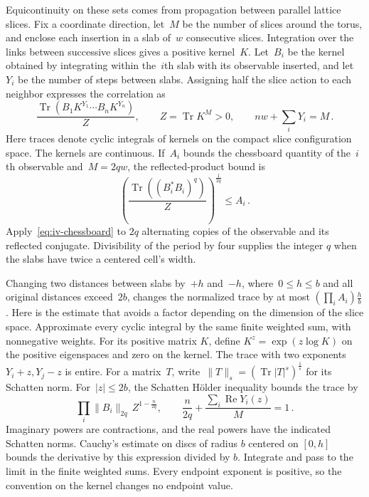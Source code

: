 Equicontinuity on these sets comes from propagation between parallel lattice slices.
Fix a coordinate direction, let~$M$ be the number of slices around the torus, and enclose each insertion in a slab of~$w$ consecutive slices.
Integration over the links between successive slices gives a positive kernel~$K$.
Let~$B_i$ be the kernel obtained by integrating within the~$i$th slab with its observable inserted, and let~$Y_i$ be the number of steps between slabs.
Assigning half the slice action to each neighbor expresses the correlation as
\begin{equation*}
\frac{\operatorname{Tr}(B_1K^{Y_1}\cdots B_nK^{Y_n})}{Z},
\qquad Z=\operatorname{Tr}K^M>0,\qquad nw+\sum_iY_i=M\,.
\end{equation*}
Here traces denote cyclic integrals of kernels on the compact slice configuration space.
The kernels are continuous.
If~$A_i$ bounds the chessboard quantity of the~$i$th observable and~$M=2qw$, the reflected-product bound is
\begin{equation*}
\left(\frac{\operatorname{Tr}((B_i^*B_i)^q)}{Z}\right)^{\frac{1}{2q}}\le A_i\,.
\end{equation*}
Apply~\eqref{eq:iv-chessboard} to $2q$ alternating copies of the observable and its reflected conjugate.
Divisibility of the period by four supplies the integer $q$ when the slabs have twice a centered cell's width.

Changing two distances between slabs by~$+h$ and~$-h$, where~$0\le h\le b$ and all original distances exceed~$2b$, changes the normalized trace by at most $(\prod_i A_i)\frac{h}{b}$.
Here is the estimate that avoids a factor depending on the dimension of the slice space.
Approximate every cyclic integral by the same finite weighted sum, with nonnegative weights.
For its positive matrix $K$, define $K^z=\exp(z\log K)$ on the positive eigenspaces and zero on the kernel.
The trace with two exponents $Y_i+z,Y_j-z$ is entire.
For a matrix~$T$, write~$\|T\|_s=(\operatorname{Tr}|T|^s)^{\frac{1}{s}}$ for its Schatten norm.
For~$|z|\le2b$, the Schatten Hölder inequality bounds the trace by
\begin{equation*}
\prod_i\|B_i\|_{2q}\,Z^{1-\frac{n}{2q}},\qquad
\frac{n}{2q}+\frac{\sum_i\operatorname{Re}Y_i(z)}{M}=1\,.
\end{equation*}
Imaginary powers are contractions, and the real powers have the indicated Schatten norms.
Cauchy's estimate on discs of radius $b$ centered on $[0,h]$ bounds the derivative by this expression divided by $b$.
Integrate and pass to the limit in the finite weighted sums.
Every endpoint exponent is positive, so the convention on the kernel changes no endpoint value.

